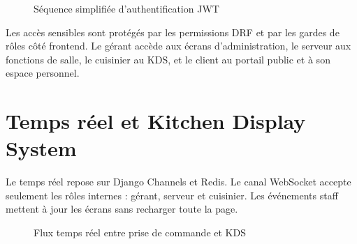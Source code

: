 \begin{figure}[H]
\centering
{}
\caption{Séquence simplifiée d'authentification JWT}
\label{fig:auth-jwt}
\end{figure}

Les accès sensibles sont protégés par les permissions DRF et par les gardes de rôles côté frontend. Le gérant accède aux écrans d'administration, le serveur aux fonctions de salle, le cuisinier au KDS, et le client au portail public et à son espace personnel.

\section{Temps réel et Kitchen Display System}
Le temps réel repose sur Django Channels et Redis. Le canal WebSocket  accepte seulement les rôles internes : gérant, serveur et cuisinier. Les événements staff mettent à jour les écrans sans recharger toute la page.

\begin{figure}[H]
\centering
{}
\caption{Flux temps réel entre prise de commande et KDS}
\label{fig:flux-kds}
\end{figure}

